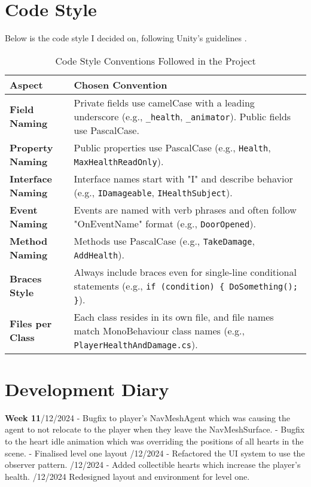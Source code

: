 \documentclass[]{final_report}
\begin{document}
\section{Code Style}
Below is the code style I decided on, following Unity's guidelines \cite{unity_2022_codestyle}.
\begin{table}[H]
\centering
\begin{tabular}{|p{4cm}|p{8cm}|}
\hline
\textbf{Aspect}              & \textbf{Chosen Convention}                                                                                   \\ \hline
\textbf{Field Naming}        & Private fields use camelCase with a leading underscore (e.g., \texttt{\_health}, \texttt{\_animator}). Public fields use PascalCase. \\ \hline
\textbf{Property Naming}     & Public properties use PascalCase (e.g., \texttt{Health}, \texttt{MaxHealthReadOnly}).                         \\ \hline
\textbf{Interface Naming}    & Interface names start with "I" and describe behavior (e.g., \texttt{IDamageable}, \texttt{IHealthSubject}).   \\ \hline
\textbf{Event Naming}        & Events are named with verb phrases and often follow "OnEventName" format (e.g., \texttt{DoorOpened}).         \\ \hline
\textbf{Method Naming}       & Methods use  PascalCase (e.g., \texttt{TakeDamage}, \texttt{AddHealth}).                    \\ \hline
\textbf{Braces Style}        & Always include braces even for single-line conditional statements (e.g., \texttt{if (condition) \{ DoSomething(); \}}). \\ \hline
\textbf{Files per Class}     & Each class resides in its own file, and file names match MonoBehaviour class names (e.g., \texttt{PlayerHealthAndDamage.cs}). \\ \hline
\end{tabular}
\caption{Code Style Conventions Followed in the Project}
\label{tab:codestyle}
\end{table}

\section{Development Diary}
\textbf{Week 11}/12/2024
\newline- Bugfix to player's NavMeshAgent which was causing the agent to not relocate to the player when they leave the NavMeshSurface.
\newline- Bugfix to the heart idle animation which was overriding the positions of all hearts in the scene.
\newline- Finalised level one layout
/12/2024
\newline- Refactored the UI system to use the observer pattern.
/12/2024
\newline- Added collectible hearts which increase the player's health.
/12/2024
\newline Redesigned layout and environment for level one.
\end{document}
